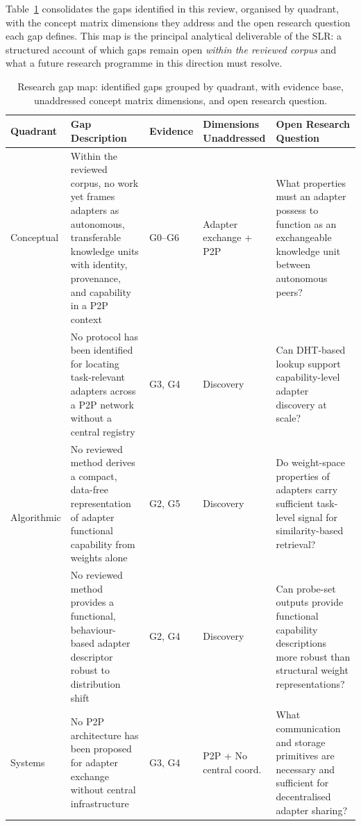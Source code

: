Table~\ref{tab:gap_map} consolidates the gaps identified in this review,
organised by quadrant, with the concept matrix dimensions they address
and the open research question each gap defines. This map is the principal
analytical deliverable of the SLR: a structured account of which gaps remain
open \emph{within the reviewed corpus} and what a future research programme
in this direction must resolve.

\begin{table}[H]
\centering
\caption{Research gap map: identified gaps grouped by quadrant, with evidence
         base, unaddressed concept matrix dimensions, and open research question.}
\label{tab:gap_map}
\setlength{\tabcolsep}{4pt}
\footnotesize
\begin{tabular}{p{2cm}p{3.5cm}p{1.5cm}p{2cm}p{4cm}}
\toprule
\textbf{Quadrant} &
\textbf{Gap Description} &
\textbf{Evidence} &
\textbf{Dimensions Unaddressed} &
\textbf{Open Research Question} \\
\midrule
Conceptual &
  Within the reviewed corpus, no work yet frames adapters as autonomous,
  transferable knowledge units with identity, provenance, and capability in a
  P2P context &
  G0--G6 &
  Adapter exchange + P2P &
  What properties must an adapter possess to function as an exchangeable
  knowledge unit between autonomous peers? \\
\midrule
\multirow{3}{*}{Algorithmic} &
  No protocol has been identified for locating task-relevant adapters across a P2P network
  without a central registry &
  G3, G4 &
  Discovery &
  Can DHT-based lookup support capability-level adapter discovery at scale? \\[4pt]
  &
  No reviewed method derives a compact, data-free representation of adapter functional
  capability from weights alone &
  G2, G5 &
  Discovery &
  Do weight-space properties of adapters carry sufficient task-level signal
  for similarity-based retrieval? \\[4pt]
  &
  No reviewed method provides a functional, behaviour-based adapter descriptor robust
  to distribution shift &
  G2, G4 &
  Discovery &
  Can probe-set outputs provide functional capability descriptions more robust
  than structural weight representations? \\
\midrule
\multirow{2}{*}{Systems} &
  No P2P architecture has been proposed for adapter exchange without central infrastructure &
  G3, G4 &
  P2P + No central coord. &
  What communication and storage primitives are necessary and sufficient for
  decentralised adapter sharing? \\[4pt]

\end{tabular}
\end{table}
